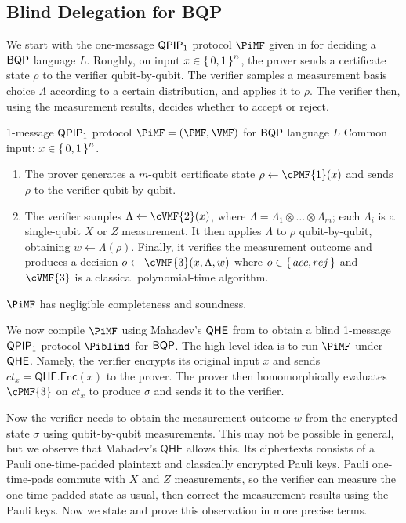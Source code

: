 \subsection{Blind Delegation for BQP}
\label{subsec:BlindBQP}

We start with the one-message $\operatorname{\mathsf{QPIP}}_1$ protocol $\PiMF$ given in \cite{mf16} for deciding a $\operatorname{\mathsf{BQP}}$ language $L$.
Roughly, on input $x\in\set{0,1}^n$, the prover sends a certificate state $\rho$ to the verifier qubit-by-qubit.
The verifier samples a measurement basis choice $\Lambda$ according to a certain distribution, and applies it to $\rho$.
The verifier then, using the measurement results, decides whether to accept or reject.

\begin{protocol}{1-message $\operatorname{\mathsf{QPIP}}_1$ protocol $\PiMF = (\PMF, \VMF)$ for $\operatorname{\mathsf{BQP}}$ language $L$}
	\label{proto:BQP}
	Common input: $x\in\set{0,1}^n$. 
	\begin{enumerate}
		\item The prover generates a $m$-qubit certificate state $\rho\leftarrow\cPMF{1}(x)$ and sends $\rho$ to the verifier qubit-by-qubit.
		\item The verifier samples $\Lambda \leftarrow \cVMF{2}(x)$, where $\Lambda=\Lambda_1\otimes\ldots\otimes\Lambda_m$;
			each $\Lambda_i$ is a single-qubit $X$ or $Z$ measurement.
			It then applies $\Lambda$ to $\rho$ qubit-by-qubit, obtaining $w\leftarrow\Lambda(\rho)$.
			Finally, it verifies the measurement outcome and produces a decision $o\leftarrow\cVMF{3}(x, \Lambda, w)$ where $o\in\set{acc, rej}$ and $\cVMF{3}$ is a classical polynomial-time algorithm.
	\end{enumerate}
\end{protocol}
\begin{thm}
    $\PiMF$ has negligible completeness and soundness.
\end{thm}

We now compile $\PiMF$ using Mahadev's $\mathsf{QHE}$ from \cite{mahadev_qfhe} to obtain a blind 1-message $\operatorname{\mathsf{QPIP}}_1$ protocol $\Piblind$ for $\operatorname{\mathsf{BQP}}$.
The high level idea is to run $\PiMF$ under $\mathsf{QHE}$.
Namely, the verifier encrypts its original input $x$ and sends $ct_x=\mathsf{QHE.Enc}(x)$ to the prover.
The prover then homomorphically evaluates $\cPMF{3}$ on $ct_x$ to produce $\sigma$ and sends it to the verifier.

Now the verifier needs to obtain the measurement outcome $w$ from the encrypted state $\sigma$ using qubit-by-qubit measurements.
This may not be possible in general, but we observe that Mahadev's $\mathsf{QHE}$ allows this. 
Its ciphertexts consists of a Pauli one-time-padded plaintext and classically encrypted Pauli keys.
Pauli one-time-pads commute with $X$ and $Z$ measurements, so the verifier can measure the one-time-padded state as usual, then correct the measurement results using the Pauli keys.
Now we state and prove this observation in more precise terms.

